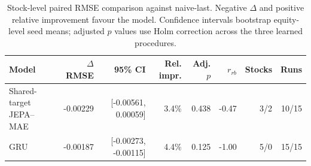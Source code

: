 \begin{table}[t]
\centering
\small
\caption{Stock-level paired RMSE comparison against naive-last. Negative $\Delta$ and positive relative improvement favour the model. Confidence intervals bootstrap equity-level seed means; adjusted $p$ values use Holm correction across the three learned procedures.}
\label{tab:paired_rmse_naive}
\begin{tabular}{lrrrrrrr}
\toprule
Model & $\Delta$RMSE & 95\% CI & Rel. impr. & Adj. $p$ & $r_{rb}$ & Stocks & Runs \\
\midrule
Shared-target JEPA--MAE & -0.00229 & [-0.00561, 0.00059] & 3.4\% & 0.438 & -0.47 & 3/2 & 10/15 \\
GRU & -0.00187 & [-0.00273, -0.00115] & 4.4\% & 0.125 & -1.00 & 5/0 & 15/15 \\
\bottomrule
\end{tabular}
\end{table}
